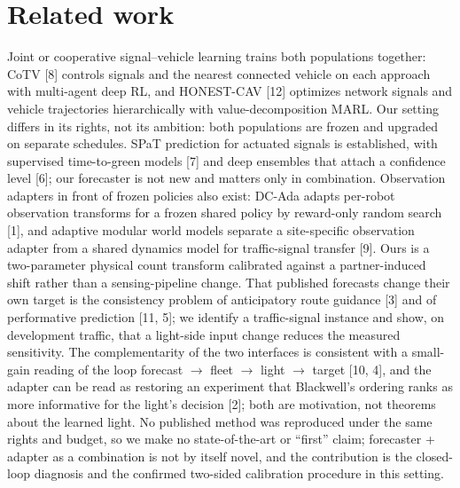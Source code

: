 \documentclass[11pt]{article}
\begin{document}
\section{Related work}
Joint or cooperative signal--vehicle learning trains both populations together: CoTV [8] controls signals and the nearest connected
vehicle on each approach with multi-agent deep RL, and HONEST-CAV [12] optimizes network signals and vehicle trajectories hierarchically
with value-decomposition MARL. Our setting differs in its rights, not its ambition: both populations are frozen and upgraded on
separate schedules. SPaT prediction for actuated signals is established, with supervised time-to-green models [7] and deep ensembles that
attach a confidence level [6]; our forecaster is not new and matters only in combination. Observation adapters in front of frozen
policies also exist: DC-Ada adapts per-robot observation transforms for a frozen shared policy by reward-only random search [1], and
adaptive modular world models separate a site-specific observation adapter from a shared dynamics model for traffic-signal transfer [9].
Ours is a two-parameter physical count transform calibrated against a partner-induced shift rather than a sensing-pipeline change. That
published forecasts change their own target is the consistency problem of anticipatory route guidance [3] and of performative prediction
[11, 5]; we identify a traffic-signal instance and show, on development traffic, that a light-side input change reduces the measured
sensitivity. The complementarity of
the two interfaces is consistent with a small-gain reading of the loop forecast $\to$ fleet $\to$ light $\to$ target [10, 4], and the
adapter can be read as restoring an experiment that Blackwell's ordering ranks as more informative for the light's decision [2]; both are
motivation, not theorems about the learned light. No published method was reproduced under the same rights and budget, so we make no
state-of-the-art or ``first'' claim; forecaster + adapter as a combination is not by itself novel, and the contribution is the
closed-loop diagnosis and the confirmed two-sided calibration procedure in this setting.
\end{document}
